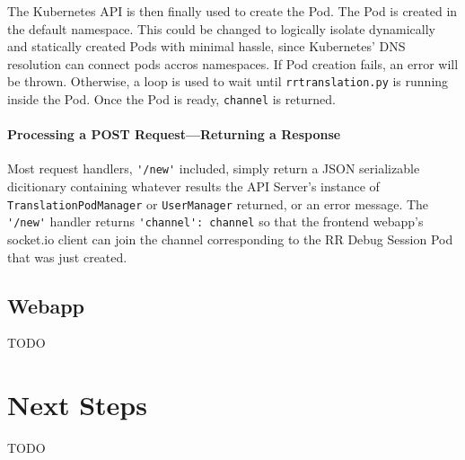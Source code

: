 \documentclass[12pt]{article}
\begin{document}
The Kubernetes API is then finally used to create the Pod.  The Pod is
created in the default namespace.  This could be changed to logically
isolate dynamically and statically created Pods with minimal hassle,
since Kubernetes' DNS resolution can connect pods accros namespaces.
If Pod creation fails, an error will be thrown.  Otherwise, a loop is
used to wait until \lstinline{rrtranslation.py} is running inside the
Pod.  Once the Pod is ready, \lstinline{channel} is returned.

\paragraph{Processing a POST Request---Returning a Response}

Most request handlers, \lstinline{'/new'} included, simply return a
JSON serializable dicitionary containing whatever results the API
Server's instance of \lstinline{TranslationPodManager} or
\lstinline{UserManager} returned, or an error message.  The
\lstinline{'/new'} handler returns \lstinline{'channel': channel} so
that the frontend webapp's socket.io client can join the channel
corresponding to the RR Debug Session Pod that was just created.

\subsection{Webapp}\label{webapp}

TODO

\section{Next Steps}

TODO

\pagebreak

{}
\end{document}
